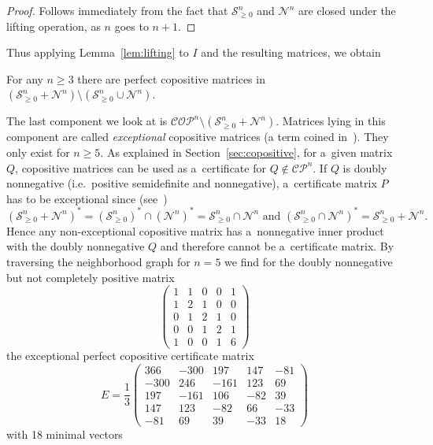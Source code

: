 \documentclass{commat}
\newcommand{\sngeo}{{\mathcal{S}}^{n}_{\geq0}}
\newcommand{\nonn}{{\mathcal{N}^{n}}}
\newcommand{\copn}{{\mathcal{COP}}^{n}}
\newcommand{\cpn}{{\mathcal{CP}}^{n}}
\begin{document}
\begin{proof}
    Follows immediately from the fact that \(\sngeo \) and \(\nonn \) are closed under
	the lifting operation, as $n$ goes to \(n+1 \).
\end{proof}
Thus applying Lemma~\ref{lem:lifting} to $I$ and the resulting matrices, we obtain
\begin{corollary}
    For any \(n \geq 3 \) there are perfect copositive matrices in
    \((\sngeo+\nonn)\setminus(\sngeo\cup\nonn) \).
\end{corollary}

The last component we look at is \(\copn\setminus(\sngeo+\nonn) \).
Matrices lying in this component are called \textit{exceptional} copositive matrices
(a term coined in~\cite{jr-2008}).
They only exist for \(n \geq 5 \).
As explained in Section~\ref{sec:copositive}, for a~given matrix $Q$, copositive matrices can be
used as a~certificate for \(Q\notin\cpn \).
If $Q$ is doubly nonnegative (i.e.\ positive semidefinite and nonnegative), a~certificate matrix
$P$ has to be exceptional since (see~\cite[Theorem 1.35 (e)]{bs-2003})
\[
	{(\sngeo+\nonn)}^* = {(\sngeo)}^* \cap{(\nonn)}^* = \sngeo\cap\nonn
	\text{ and }
	{(\sngeo\cap\nonn)}^* = \sngeo+\nonn.
\]
Hence any non-exceptional copositive matrix has a~nonnegative inner product with the doubly
nonnegative $Q$ and therefore cannot be a~certificate matrix.
By traversing the neighborhood graph for \(n = 5 \) we find for the doubly nonnegative but not
completely positive matrix
\[
    \begin{pmatrix}
        1 & 1 & 0 & 0 & 1 \\
        1 & 2 & 1 & 0 & 0 \\
        0 & 1 & 2 & 1 & 0 \\
        0 & 0 & 1 & 2 & 1 \\
        1 & 0 & 0 & 1 & 6
    \end{pmatrix}
\]
the exceptional perfect copositive certificate matrix
\[
    E = \frac13
\begin{pmatrix}
       366 & -300 & 197 & 147 & -81 \\
       -300 & 246 & -161 & 123 & 69 \\
       197 & -161 & 106 & -82 & 39 \\
       147 & 123 & -82 & 66 & -33 \\
       -81 & 69 & 39 & -33 & 18
    \end{pmatrix}
\]
with 18 minimal vectors
\end{document}
